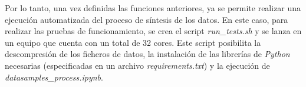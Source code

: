 \vspace{3mm}

Por lo tanto, una vez definidas las funciones anteriores, ya se permite realizar una ejecución automatizada del proceso de síntesis de los datos. En este caso, para realizar las pruebas de funcionamiento, se crea el script \textit{run\_tests.sh} y se lanza en un equipo que cuenta con un total de 32 cores. Este script posibilita la descompresión de los ficheros de datos, la instalación de las librerías de \textit{Python} necesarias (especificadas en un archivo \textit{requirements.txt}) y la ejecución de \textit{datasamples\_process.ipynb}.

\vspace{3mm}


  
  
  
  
  
  
  
